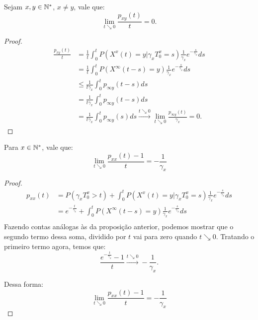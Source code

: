 \begin{proposicao}
  Sejam $x, y \in {\mathbb{N^*}}$, $x \neq y$, vale que:
  \begin{displaymath}
    \lim_{t \searrow 0} \frac{p_{xy}(t)}{t} = 0.
  \end{displaymath}
\end{proposicao}
\begin{proof}
  \begin{align*}
    \frac{p_{x y} (t)}{t}
    &= \frac{1}{t}\int_{0}^{t} P( X^x(t) = y |
    \gamma_x T_0^x = s) \frac{1}{\gamma_x} e^{-\frac{s}{\gamma_x}} ds\\
    &= \frac{1}{t} \int_{0}^{t} P( X^\infty(t-s) = y ) \frac{1}{\gamma_x}
    e^{-\frac{s}{\gamma_x}} ds \\
    &\leq \frac{1}{t \gamma_x} \int_{0}^{t} p_{\infty y}(t-s) ds \\
    &= \frac{1}{t \gamma_x} \int_{0}^{t} p_{\infty y}(t-s) ds \\
    &= \frac{1}{t \gamma_x} \int_{0}^{t} p_{\infty y}(s) ds
    \xrightarrow{t \searrow 0} \lim_{t \searrow 0} \frac{p_{\infty y}
      (t)}{\gamma_x} = 0.
  \end{align*}

\end{proof}

\begin{proposicao}
  Para $x \in {\mathbb{N^*}}$, vale que:
  \begin{displaymath}
    \lim_{t \searrow 0} \frac{p_{xx}(t) - 1}{t} = -\frac{1}{\gamma_x}
  \end{displaymath}
\end{proposicao}
\begin{proof}
  \begin{align*}
    p_{xx} (t)
    &= P( \gamma_x T_0^x > t) + 
    \int_{0}^{t} P( X^x(t) = y |
    \gamma_x T_0^x = s) \frac{1}{\gamma_x} e^{-\frac{s}{\gamma_x}} ds\\
    &= e^{-\frac{t}{\gamma_x}} + 
    \int_{0}^{t} P( X^\infty(t-s) = y) \frac{1}{\gamma_x} e^{-\frac{s}{\gamma_x}} ds\\
  \end{align*}
  Fazendo contas análogas às da proposição anterior, podemos
  mostrar que o segundo termo dessa soma, dividido por $t$ vai para
  zero quando $t \searrow 0$. Tratando o primeiro termo agora, temos
  que:
  \begin{displaymath}
    \frac{e^{-\frac{t}{\gamma_x}} - 1}{t} \xrightarrow{t \searrow 0}
    -\frac{1}{\gamma_x}.
  \end{displaymath}

  Dessa forma:
  \begin{displaymath}
     \lim_{t \searrow 0} \frac{p_{xx} (t) - 1}{t} = -\frac{1}{\gamma_x}
  \end{displaymath}
  
\end{proof}

